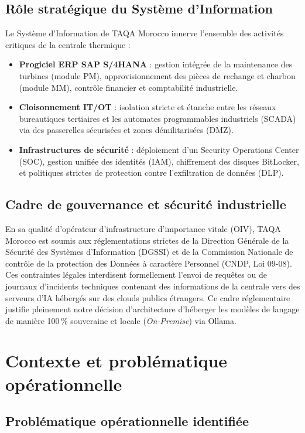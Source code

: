 \documentclass[12pt, a4paper, oneside]{report}
\begin{document}
\subsection{Rôle stratégique du Système d'Information}

Le Système d'Information de TAQA Morocco innerve l'ensemble des activités critiques de la centrale thermique :
\begin{itemize}
  \item \textbf{Progiciel ERP SAP S/4HANA} : gestion intégrée de la maintenance des turbines (module PM), approvisionnement des pièces de rechange et charbon (module MM), contrôle financier et comptabilité industrielle.
  \item \textbf{Cloisonnement IT/OT} : isolation stricte et étanche entre les réseaux bureautiques tertiaires et les automates programmables industriels (SCADA) via des passerelles sécurisées et zones démilitarisées (DMZ).
  \item \textbf{Infrastructures de sécurité} : déploiement d'un Security Operations Center (SOC), gestion unifiée des identités (IAM), chiffrement des disques BitLocker, et politiques strictes de protection contre l'exfiltration de données (DLP).
\end{itemize}

\subsection{Cadre de gouvernance et sécurité industrielle}

En sa qualité d'opérateur d'infrastructure d'importance vitale (OIV), TAQA Morocco est soumis aux réglementations strictes de la Direction Générale de la Sécurité des Systèmes d'Information (DGSSI) et de la Commission Nationale de contrôle de la protection des Données à caractère Personnel (CNDP, Loi 09-08). Ces contraintes légales interdisent formellement l'envoi de requêtes ou de journaux d'incidents techniques contenant des informations de la centrale vers des serveurs d'IA hébergés sur des clouds publics étrangers. Ce cadre réglementaire justifie pleinement notre décision d'architecture d'héberger les modèles de langage de manière 100\,\% souveraine et locale (\textit{On-Premise}) via Ollama.

\section{Contexte et problématique opérationnelle}

\subsection{Problématique opérationnelle identifiée}
\end{document}

